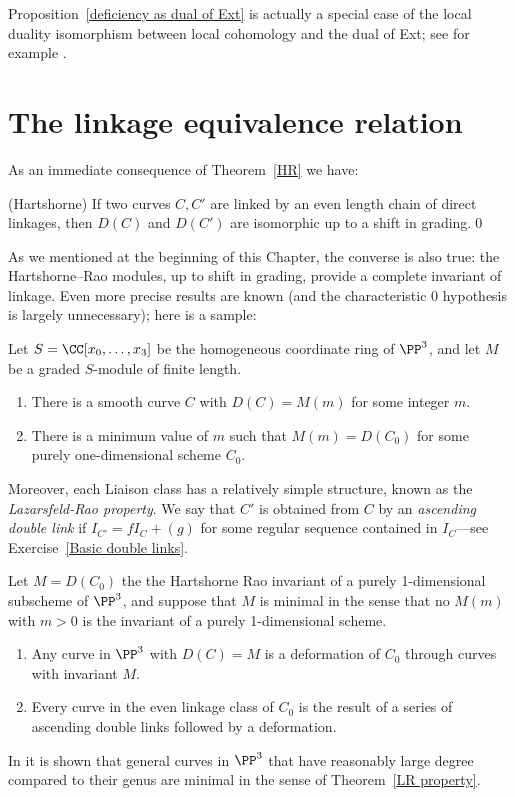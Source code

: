 Proposition~\ref{deficiency as dual of Ext} is actually a special case of the local duality isomorphism between local cohomology and the dual of Ext; see for example \cite[Theorem A.1.9]{MR2103875}.

\section{The linkage equivalence relation}
As an immediate consequence of Theorem~\ref{HR} we have:
\begin{corollary}(Hartshorne)
 If two curves $C,C'$ are linked by an even length chain of direct linkages, then 
 $D(C)$ and $D(C')$ are isomorphic up to a shift in grading.\qed
\end{corollary}

As we mentioned at the beginning of this Chapter, the converse is also true: the Hartshorne--Rao modules, up to shift in grading, provide a complete invariant of
linkage. Even more precise results are known (and the characteristic 0 hypothesis is largely unnecessary); here is a sample:

\begin{fact}
\begin{theorem}
Let $S = \CC[x_0, \dots, x_3]$ be the homogeneous coordinate ring of $\PP^3$, and let $M$ be a graded $S$-module of finite length.
\begin{enumerate}
\item There is a smooth curve $C$ with $D(C) = M(m)$ for some integer $m$.
\item There is a minimum value of $m$ such that $M(m) = D(C_0)$ for some purely one-dimensional scheme $C_0$.
\end{enumerate}
\end{theorem}

Moreover, each Liaison class has a relatively simple structure, known as the \emph{Lazarsfeld-Rao property}.
We say that $C'$ is obtained from $C$ by an \emph{ascending double link} if $I_{C'} = fI_C+(g)$ for some regular sequence
contained in $I_C$---see Exercise~\ref{Basic double links}. 

\begin{theorem}\cite{MR1087803}\label{LR property}
Let $M = D(C_0)$ the the Hartshorne Rao invariant of a purely 1-dimensional subscheme of $\PP^3$, and suppose that
$M$ is minimal in the sense that no $M(m)$ with $m>0$ is the invariant of a purely 1-dimensional scheme. 
\begin{enumerate}
 \item Any curve in $\PP^3$ with $D(C) = M$ is a deformation of $C_{0}$ through curves with invariant $M$.
 \item Every curve in the even linkage class of $C_0$ is the result of a series of ascending double links followed by a deformation.
\end{enumerate}
\end{theorem}

In \cite{MR714753} it is shown that general curves  in $\PP^3$ that have 
reasonably large degree compared to their genus are minimal in the sense 
of  Theorem~\ref{LR property}.
\end{fact}

